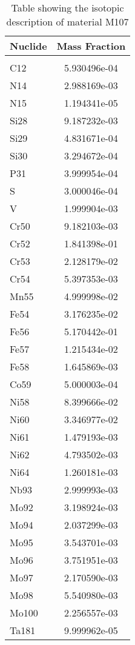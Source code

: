 \begin{centering}
\begin{table}[ht!]
\begin{tabular}{l | c}
\hline
Nuclide & Mass Fraction\\
\hline
\\
C12 & 5.930496e-04\\
N14 & 2.988169e-03\\
N15 & 1.194341e-05\\
Si28 & 9.187232e-03\\
Si29 & 4.831671e-04\\
Si30 & 3.294672e-04\\
P31 & 3.999954e-04\\
S & 3.000046e-04\\
V & 1.999904e-03\\
Cr50 & 9.182103e-03\\
Cr52 & 1.841398e-01\\
Cr53 & 2.128179e-02\\
Cr54 & 5.397353e-03\\
Mn55 & 4.999998e-02\\
Fe54 & 3.176235e-02\\
Fe56 & 5.170442e-01\\
Fe57 & 1.215434e-02\\
Fe58 & 1.645869e-03\\
Co59 & 5.000003e-04\\
Ni58 & 8.399666e-02\\
Ni60 & 3.346977e-02\\
Ni61 & 1.479193e-03\\
Ni62 & 4.793502e-03\\
Ni64 & 1.260181e-03\\
Nb93 & 2.999993e-03\\
Mo92 & 3.198924e-03\\
Mo94 & 2.037299e-03\\
Mo95 & 3.543701e-03\\
Mo96 & 3.751951e-03\\
Mo97 & 2.170590e-03\\
Mo98 & 5.540980e-03\\
Mo100 & 2.256557e-03\\
Ta181 & 9.999962e-05
\end{tabular}
\caption{Table showing the isotopic description of material M107}
\label{table:material_M107}
\end{table}\clearpage


\end{centering}
